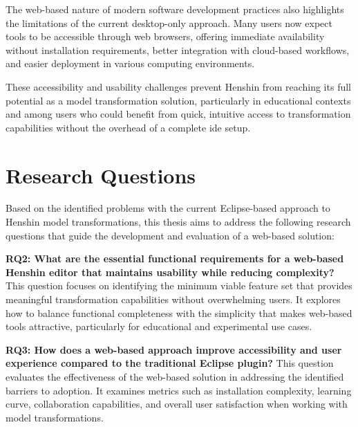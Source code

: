 The web-based nature of modern software development practices also highlights the limitations of the current desktop-only approach. Many users now expect tools to be accessible through web browsers, offering immediate availability without installation requirements, better integration with cloud-based workflows, and easier deployment in various computing environments.

These accessibility and usability challenges prevent Henshin from reaching its full potential as a model transformation solution, particularly in educational contexts and among users who could benefit from quick, intuitive access to transformation capabilities without the overhead of a complete \ac{ide} setup.

\section{Research Questions}
\label{subsec:research-questions}

Based on the identified problems with the current Eclipse-based approach to Henshin model transformations, this thesis aims to address the following research questions that guide the development and evaluation of a web-based solution:


\textbf{RQ2: What are the essential functional requirements for a web-based Henshin editor that maintains usability while reducing complexity?}
This question focuses on identifying the minimum viable feature set that provides meaningful transformation capabilities without overwhelming users. It explores how to balance functional completeness with the simplicity that makes web-based tools attractive, particularly for educational and experimental use cases.

\textbf{RQ3: How does a web-based approach improve accessibility and user experience compared to the traditional Eclipse plugin?}
This question evaluates the effectiveness of the web-based solution in addressing the identified barriers to adoption. It examines metrics such as installation complexity, learning curve, collaboration capabilities, and overall user satisfaction when working with model transformations.

